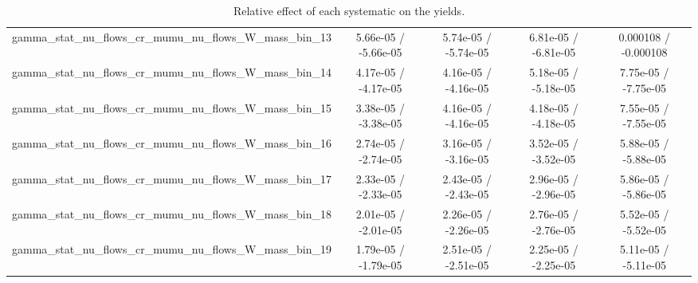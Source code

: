 \documentclass[10pt]{article}
\begin{document}
\begin{table}[htbp]
\begin{center}
\begin{tabular}{|c|c|c|c|c|}
  gamma_stat_nu_flows_cr_mumu_nu_flows_W_mass_bin_13 & 5.66e-05 / -5.66e-05 & 5.74e-05 / -5.74e-05 & 6.81e-05 / -6.81e-05 & 0.000108 / -0.000108 \\ 
  gamma_stat_nu_flows_cr_mumu_nu_flows_W_mass_bin_14 & 4.17e-05 / -4.17e-05 & 4.16e-05 / -4.16e-05 & 5.18e-05 / -5.18e-05 & 7.75e-05 / -7.75e-05 \\ 
  gamma_stat_nu_flows_cr_mumu_nu_flows_W_mass_bin_15 & 3.38e-05 / -3.38e-05 & 4.16e-05 / -4.16e-05 & 4.18e-05 / -4.18e-05 & 7.55e-05 / -7.55e-05 \\ 
  gamma_stat_nu_flows_cr_mumu_nu_flows_W_mass_bin_16 & 2.74e-05 / -2.74e-05 & 3.16e-05 / -3.16e-05 & 3.52e-05 / -3.52e-05 & 5.88e-05 / -5.88e-05 \\ 
  gamma_stat_nu_flows_cr_mumu_nu_flows_W_mass_bin_17 & 2.33e-05 / -2.33e-05 & 2.43e-05 / -2.43e-05 & 2.96e-05 / -2.96e-05 & 5.86e-05 / -5.86e-05 \\ 
  gamma_stat_nu_flows_cr_mumu_nu_flows_W_mass_bin_18 & 2.01e-05 / -2.01e-05 & 2.26e-05 / -2.26e-05 & 2.76e-05 / -2.76e-05 & 5.52e-05 / -5.52e-05 \\ 
  gamma_stat_nu_flows_cr_mumu_nu_flows_W_mass_bin_19 & 1.79e-05 / -1.79e-05 & 2.51e-05 / -2.51e-05 & 2.25e-05 / -2.25e-05 & 5.11e-05 / -5.11e-05 \\ 
\hline 
\end{tabular} 
\caption{Relative effect of each systematic on the yields.} 
\end{center} 
\end{table} 
\end{document}
